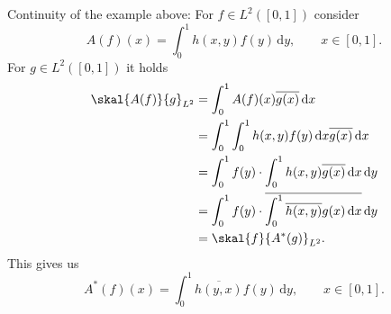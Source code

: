 \begin{beispiel}
	Continuity of the example above: For $f \in L^2([0,1])$ consider
	\[
		A(f)(x) = \int_{0}^{1}h(x,y)f(y) \,\mathrm{d}y, \qquad x \in [0,1].
	\]
	For $g \in L^2([0,1])$ it holds
	\begin{align*}
		\skal{A(f)}{g}_{L^2} &= \int_{0}^{1} A(f)(x)\overline{g(x)} \,\mathrm{d}x \\
		&= \int_{0}^{1}\int_{0}^{1} h(x,y)f(y) \,\mathrm{d}x \overline{g(x)} \,\mathrm{d}x \\
		&= \int_{0}^{1}f(y) \cdot \int_{0}^{1}h(x,y) \overline{g(x)} \,\mathrm{d}x \,\mathrm{d}y \\
		&= \int_{0}^{1} f(y) \cdot \overline{\int_{0}^{1} \overline{h(x,y)} g(x) \,\mathrm{d}x} \,\mathrm{d}y \\
		&= \skal{f}{A^*(g)}_{L^2}.
	\end{align*}
	This gives us 
	\[
		A^*(f)(x) = \int_{0}^{1} \overline{h(y,x)}f(y) \,\mathrm{d}y, \qquad x \in [0,1].
	\]
\end{beispiel}

